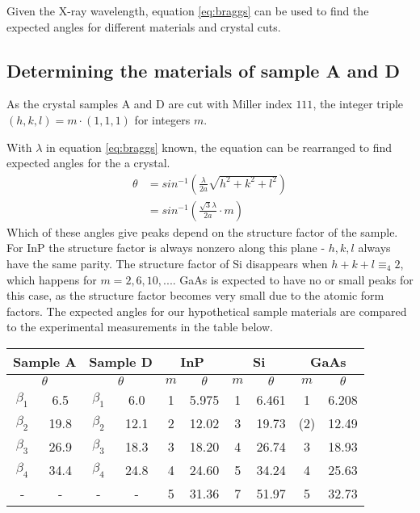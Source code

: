 \documentclass[a4paper,twoside=false,abstract=false,numbers=noenddot,
titlepage=false,headings=small,parskip=half,version=last]{scrartcl}
\begin{document}
Given the X-ray wavelength, equation \eqref{eq:braggs} can be used to find the expected angles for different materials and crystal cuts.

\subsection{Determining the materials of sample A and D}

As the crystal samples A and D are cut with Miller index $111$,
the integer triple $(h,k,l)=m\cdot (1,1,1)$ for integers $m$.

With $\lambda$ in equation \eqref{eq:braggs} known, the equation can be rearranged to find expected angles for the a crystal.
\begin{align}
\label{eq:braggangle}
\theta&=sin^{-1}\left( \frac{\lambda}{2a} \sqrt{h^2+k^2+l^2}\right)\\
&=sin^{-1}\left( \frac{\sqrt{3}\lambda}{2a} \cdot m\right)\nonumber
\end{align}
Which of these angles give peaks depend on the structure factor of the sample.
For InP the structure factor is always nonzero along this plane - $h,k,l$ always have the same parity.
The structure factor of Si disappears when $h+k+l\equiv_4 2$, which happens for $m=2,6,10,...$.
GaAs is expected to have no or small peaks for this case, as the structure factor becomes very small due to the atomic form factors.
The expected angles for our hypothetical sample materials are compared to the experimental measurements in the table below.

\begin{tabular}{ |c|c|c|c|c|c|c|c|c|c| }
    \hline
    \multicolumn{2}{|c|}{Sample A}
	& \multicolumn{2}{|c|}{Sample D}
	& \multicolumn{2}{|c|}{InP}
	& \multicolumn{2}{|c|}{Si}
	& \multicolumn{2}{|c|}{GaAs}\\
    \hline
	\multicolumn{2}{|c|}{$\theta$} & \multicolumn{2}{|c|}{$\theta$} & $m$ & $\theta$ & $m$ & $\theta$ & $m$ & $\theta$ \\
	\hline
    $\beta_1$	& 6.5\degree	& $\beta_1$	& 6.0\degree	& 1 & 5.975\degree & 1	& 6.461\degree &  1		& 6.208\degree	\\
    $\beta_2$	& 19.8\degree	& $\beta_2$	& 12.1\degree	& 2 & 12.02\degree & 3	& 19.73\degree & (2)	& 12.49\degree	\\
    $\beta_3$	& 26.9\degree	& $\beta_3$	& 18.3\degree	& 3 & 18.20\degree & 4	& 26.74\degree &  3		& 18.93\degree	\\
    $\beta_4$	& 34.4\degree	& $\beta_4$	& 24.8\degree	& 4 & 24.60\degree & 5	& 34.24\degree &  4		& 25.63\degree	\\
    -			& -				& -			& -				& 5 & 31.36\degree & 7	& 51.97\degree &  5		& 32.73\degree	\\
	\hline
\end{tabular}
\end{document}
